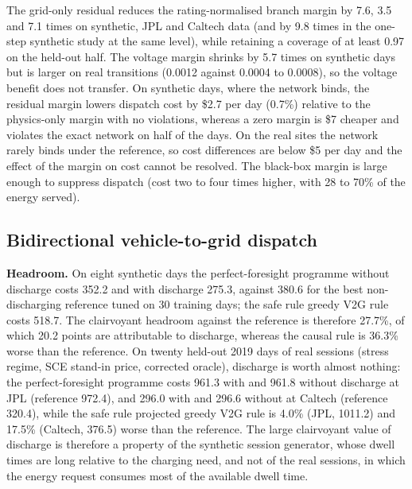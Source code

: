 \documentclass[11pt]{article}
\begin{document}
The grid-only residual reduces the rating-normalised branch margin by 7.6, 3.5 and 7.1 times on synthetic, JPL and Caltech data (and by 9.8 times in the one-step synthetic study at the same level), while retaining a coverage of at least 0.97 on the held-out half. The voltage margin shrinks by 5.7 times on synthetic days but is larger on real transitions (0.0012 against 0.0004 to 0.0008), so the voltage benefit does not transfer. On synthetic days, where the network binds, the residual margin lowers dispatch cost by \$2.7 per day (0.7\%) relative to the physics-only margin with no violations, whereas a zero margin is \$7 cheaper and violates the exact network on half of the days. On the real sites the network rarely binds under the reference, so cost differences are below \$5 per day and the effect of the margin on cost cannot be resolved. The black-box margin is large enough to suppress dispatch (cost two to four times higher, with 28 to 70\% of the energy served).

\subsection{Bidirectional vehicle-to-grid dispatch}\label{sec:v2g}
\textbf{Headroom.} On eight synthetic days the perfect-foresight programme without discharge costs 352.2 and with discharge 275.3, against 380.6 for the best non-discharging reference tuned on 30 training days; the safe rule greedy V2G rule costs 518.7. The clairvoyant headroom against the reference is therefore 27.7\%, of which 20.2 points are attributable to discharge, whereas the causal rule is 36.3\% worse than the reference. On twenty held-out 2019 days of real sessions (stress regime, SCE stand-in price, corrected oracle), discharge is worth almost nothing: the perfect-foresight programme costs 961.3 with and 961.8 without discharge at JPL (reference 972.4), and 296.0 with and 296.6 without at Caltech (reference 320.4), while the safe rule projected greedy V2G rule is 4.0\% (JPL, 1011.2) and 17.5\% (Caltech, 376.5) worse than the reference. The large clairvoyant value of discharge is therefore a property of the synthetic session generator, whose dwell times are long relative to the charging need, and not of the real sessions, in which the energy request consumes most of the available dwell time.
\end{document}
